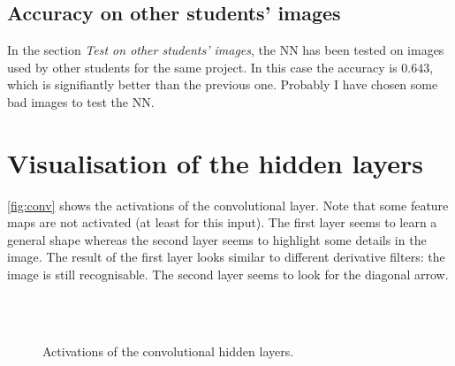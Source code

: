 \documentclass{article}
\begin{document}
\subsection{Accuracy on other students' images}
In the section \textit{Test on other students' images}, the NN has been tested on images used by other students for the same project. In this case the accuracy is $0.643$, which is signifiantly better than the previous one. Probably I have chosen some bad images to test the NN.

\section{Visualisation of the hidden layers}
\autoref{fig:conv} shows the activations of the convolutional layer. Note that some feature maps are not activated (at least for this input). The first layer seems to learn a general shape whereas the second layer seems to highlight some details in the image. The result of the first layer looks similar to different derivative filters: the image is still recognisable. The second layer seems to look for the diagonal arrow.
\begin{figure}
\centering
{}\\
\\
\caption{Activations of the convolutional hidden layers.}
\label{fig:conv}
\end{figure}
\end{document}
